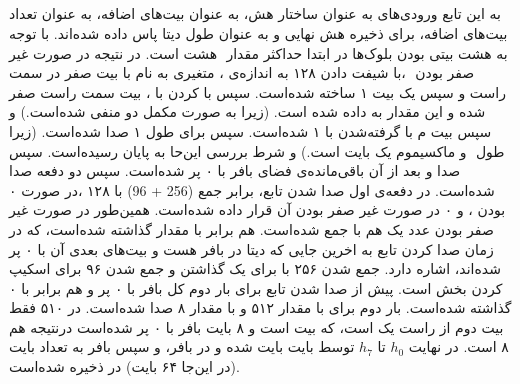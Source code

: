 \subsection{}
\label{subsec:big-close}
به این تابع ورودی‌های   به عنوان ساختار هش،   به عنوان بیت‌های اضافه،  به عنوان تعداد بیت‌های اضافه،   برای ذخیره هش نهایی و   به عنوان طول دیتا پاس داده شده‌اند. با توجه به هشت بیتی بودن بلوک‌ها در ابتدا حداکثر مقدار ‌  هشت است. در نتیجه در صورت غیر صفر بودن ‌ ،با شیفت دادن ۱۲۸ به اندازه‌ی  ،  متغیری به نام    با   بیت صفر در سمت راست و سپس یک بیت ۱ ساخته‌ شده‌است. سپس  با   کردن   با    ،   بیت سمت راست   صفر شده و این مقدار به  داده شده ‌است. (زیرا   به صورت مکمل دو منفی شده‌است.) و سپس بیت  م   با  گرفته‌شدن با    ۱ شده‌است. سپس  \hyperref[subsec:skein-big-core]{} برای طول ۱ صدا شده‌است. (زیرا طول ‌ و ماکسیموم  یک بایت است.) و شرط بررسی    این‌حا به پایان رسیده‌است.
سپس \hyperref[subsec:read-state-big]{} صدا و بعد از ‌آن باقی‌مانده‌ی فضای بافر با ۰ پر شده‌است.
سپس دو دفعه  \hyperref[subsec:ubi-big]{}صدا شده‌است. در دفعه‌ی اول صدا شدن تابع،   برابر جمع (256 + 96) با ۱۲۸ ،در صورت ۰ بودن  ، و ۰ در صورت غیر صفر بودن آن قرار داده‌ شده‌است. همین‌طور در صورت غیر صفر بودن ‌  عدد یک هم با   جمع شده‌است.   هم برابر با مقدار  گذاشته شده‌است،‌ که در زمان صدا کردن تابع به اخرین جایی که دیتا در بافر هست و بیت‌های بعدی ‌آن با ۰ پر شده‌اند، اشاره دارد. جمع شدن ۲۵۶ با   برای یک گذاشتن   و جمع شدن ۹۶ برای اسکیپ کردن بخش   است. پیش از صدا شدن تابع برای بار دوم کل بافر با ۰ پر و   هم برابر با ۰ گذاشته شده‌است. بار دوم   برای   با مقدار ۵۱۲ و  با مقدار ۸ صدا شده‌است. در ۵۱۰ فقط بیت دوم از راست یک است، که بیت  است و ۸ بایت بافر با ۰ پر شده‌است درنتیجه  هم ۸ است. 
در نهایت $ h_0 $ تا $ h_7 $ توسط  بایت بایت شده و در بافر، و سپس بافر به تعداد بایت  (در این‌جا ۶۴ بایت) در  ذخیره شده‌است.